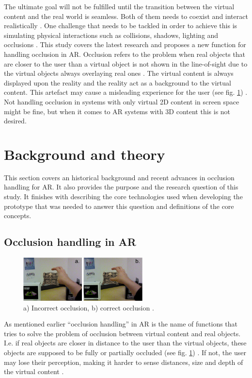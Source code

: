 The ultimate goal will not be fulfilled until the transition between the virtual content and the real world is seamless. Both of them needs to coexist and interact realistically \cite{breen1996interactive}. One challenge that needs to be tackled in order to achieve this is simulating physical interactions such as collisions, shadows, lighting and occlusions \cite{fortin2006handling}.
This study covers the latest research and proposes a new function for handling occlusion in AR. Occlusion refers to the problem when real objects that are closer to the user than a virtual object is not shown in the line-of-sight due to the virtual objects always overlaying real ones \cite{breen1996interactive}. The virtual content is always displayed upon the reality and the reality act as a background to the virtual content. This artefact may cause a misleading experience for the user (see fig. \ref{fig:_image_occlusion-example}) \cite{shah2012occlusion}. Not handling occlusion in systems with only virtual 2D content in screen space might be fine, but when it comes to AR systems with 3D content this is not desired. 

\section{Background and theory}
This section covers an historical background and recent advances in occlusion handling for AR. It also provides the purpose and the research question of this study. It finishes with describing the core technologies used when developing the prototype that was needed to answer this question and definitions of the core concepts.
\subsection{Occlusion handling in AR}
\begin{figure}
\includegraphics[width=246.666px, height=89.333px]{_image_occlusion-example}
\caption{a) Incorrect occlusion, b) correct occlusion \cite{du2016edge}.}
\label{fig:_image_occlusion-example}
\end{figure}

As mentioned earlier ``occlusion handling'' in AR is the name of functions that tries to solve the problem of occlusion between virtual content and real objects. I.e. if real objects are closer in distance to the user than the virtual objects, these objects are supposed to be fully or partially occluded (see fig. \ref{fig:_image_occlusion-example}) . If not, the user may lose their perception, making it harder to sense distances, size and depth of the virtual content \cite{shah2012occlusion}.

